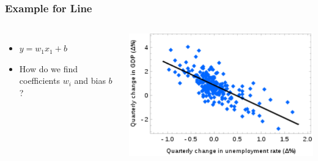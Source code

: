\begin{frame}
    \frametitle{Example for Line}
    \begin{columns}
            \begin{itemize}
                \item $y =  w_1 x_1 + b$
                \item How do we find coefficients $w_i$ and bias $b$ ? 
            \end{itemize}
            \includegraphics[width=1\linewidth]{linreg-pics/lg}\\

    \end{columns}
\end{frame}





